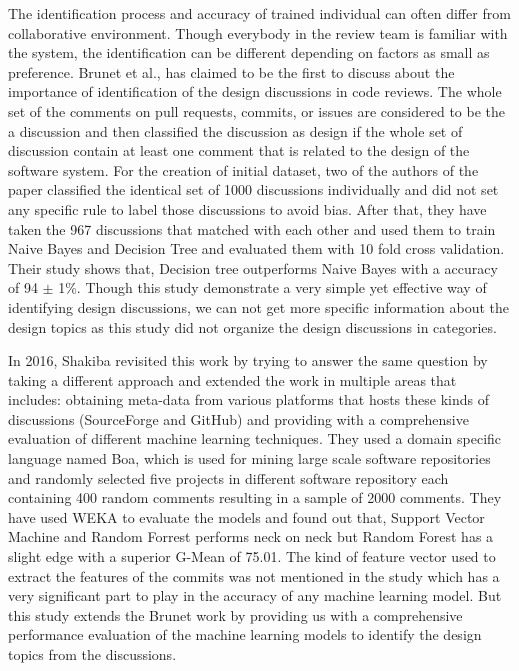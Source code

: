 The identification process and accuracy of trained individual can often differ from collaborative environment. Though everybody in the review team is familiar \cite{Sousa2017} with the system, the identification can be different depending on factors as small as preference. Brunet et al.,\cite{Brunet2014a} has claimed to be the first to discuss about the importance of identification of the design discussions in code reviews. The whole set of the comments on pull requests, commits, or issues are considered to be the a discussion and then classified the discussion as design if the whole set of discussion contain at least one comment that is related to the design of the software system. For the creation of initial dataset, two of the authors of the paper classified the identical set of 1000 discussions individually and did not set any specific rule to label those discussions to avoid bias. After that, they have taken the 967 discussions that matched with each other and used them to train Naive Bayes and Decision Tree and evaluated them with 10 fold cross validation. Their study shows that, Decision tree outperforms Naive Bayes with a accuracy of 94 {$\pm$} 1\%. Though this study demonstrate a very simple yet effective way of identifying design discussions, we can not get more specific information about the design topics as this study did not organize the design discussions in categories. 

In 2016, Shakiba \cite{Shakiba2016} revisited this work by trying to answer the same question by taking a different approach and extended the work in multiple areas that includes: obtaining meta-data from various platforms that hosts these kinds of discussions (SourceForge and GitHub) and providing with a comprehensive evaluation of different machine learning techniques. They used a domain specific language named Boa, which is used for mining large scale software repositories and randomly selected five projects in different software repository each containing 400 random comments resulting in a sample of 2000 comments. They have used WEKA to evaluate the models and found out that, Support Vector Machine and Random Forrest performs neck on neck but Random Forest has a slight edge with a superior G-Mean of 75.01. The kind of feature vector used to extract the features of the commits was not mentioned in the study which has a very significant part to play in the accuracy of any machine learning model. But this study extends the Brunet work by providing us with a comprehensive performance evaluation of the machine learning models to identify the design topics from the discussions.

